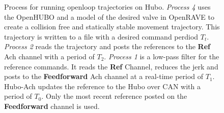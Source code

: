 \begin{figure}[thpb]
  \caption{Process for running openloop trajectories on Hubo.  \textit{Process 4} uses the OpenHUBO and a model of the desired valve in OpenRAVE to create a collision free and statically stable movement trajectory.  This trajectory is written to a file with a desired command perdiod $T_t$.  \textit{Process 2} reads the trajectory and posts the references to the \textbf{Ref} Ach channel with a period of $T_2$.  \textit{Process 1} is a low-pass filter for the reference commands.  It reads the \textbf{Ref} Channel, reduces the jerk and posts to the \textbf{Feedforward} Ach channel at a real-time period of $T_1$.  Hubo-Ach updates the reference to the Hubo over CAN with a period of $T_0$.  Only the most recent reference posted on the \textbf{Feedforward} channel is used.}
  \label{fig:graph-ros-valve}
\end{figure}








